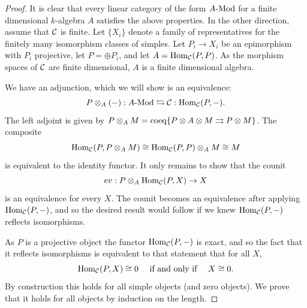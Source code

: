 \documentclass{amsart}
\begin{document}
\begin{proof}
	It is clear that every linear category of the form $\Mod{A}{}$ for a finite dimensional $k$-algebra $A$ satisfies the above properties. %
	In the other direction, assume that $\mathcal C$ is finite. Let $\{X_i\}$ denote a family of representatives for the finitely many isomorphism classes of simples. Let $P_i \to X_i$ be an epimorphism with $P_i$ projective, let $P = \oplus P_i$, and let $A = \operatorname{Hom}_{\mathcal C}(P,P)$. As the morphism spaces of $\mathcal C$ are finite dimensional, $A$ is a finite dimensional algebra. 
	
We have an adjunction, which we will show is an equivalence:
	\begin{equation*}
		P \otimes_A (-):\Mod{A}{} \leftrightarrows \cC: \Hom_{\cC}(P,-).
	\end{equation*}
	The left adjoint is given by $P \otimes_A M = \operatorname{coeq}\{ P \otimes A \otimes M \rightrightarrows P \otimes M\}$. 
The composite 
\begin{equation*}
	\operatorname{Hom}_{\mathcal C}(P, P \otimes_A M) \cong \operatorname{Hom}_{\mathcal C}(P, P) \otimes_A M \cong M
\end{equation*}
 is equivalent to the identity functor. It only remains to show that the counit 
\begin{equation*}
	ev:P \otimes_A \operatorname{Hom}_{\mathcal C}(P, X) \to X
\end{equation*}
is an equivalence for every $X$. The counit becomes an equivalence after applying $\operatorname{Hom}_{\mathcal C}(P,-)$, and so the desired result would follow if we knew $\operatorname{Hom}_{\mathcal C}(P,-)$ reflects isomorphisms. 

As $P$ is a projective object the functor $\operatorname{Hom}_{\mathcal C}(P,-)$ is exact, and so the fact that it reflects isomorphisms is equivalent to that statement that for all $X$, 
\begin{equation*}
	\operatorname{Hom}_{\mathcal C}(P,X) \cong 0 \quad \textrm{ if and only if } \quad X \cong 0.
\end{equation*} 
By construction this holds for all simple objects (and zero objects). We prove that it holds for all objects by induction on the length. 


\end{proof}
\end{document}
